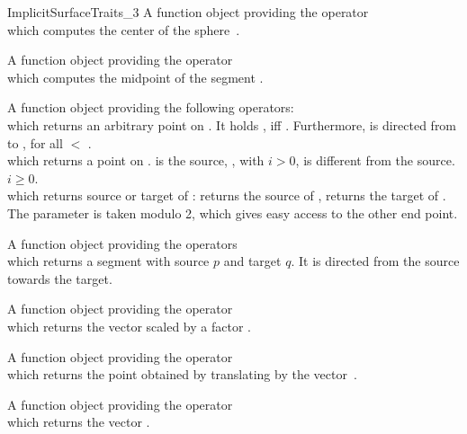\begin{ccRefConcept}{ImplicitSurfaceTraits_3}
{A function object providing the operator\\
 which computes the center of
the sphere~.}

{A function object providing the operator\\
 which computes
the midpoint of the segment .}

{A function object providing the following operators:\\
   which returns an
  arbitrary point on . It holds , iff
  . Furthermore, is directed from  to
  , for all  $<$ .\\
   which returns a point on
  .  is the source, , with
  $i>0$, is different from the source. \ccPrecond $i \geq 0$.\\
   which returns source
  or target of :  returns the source of ,
   returns the target of . The parameter
   is taken modulo 2, which gives easy access to the other end
  point.
}

{A function object providing the operators\\
   which
  returns a segment with source $p$ and target $q$. It is directed from the
  source towards the target.}

{A function object providing the operator\\
 which returns
the vector  scaled by a factor .}

{A function object providing the operator\\
 which returns
the point obtained by translating  by the vector~.}

{A function object providing the operator\\
 which returns
the vector .}


\end{ccRefConcept}
